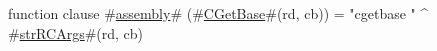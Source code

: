 function clause #\hyperref[sailMIPSzassembly]{assembly}# (#\hyperref[sailMIPSzCGetBase]{CGetBase}#(rd, cb)) = "cgetbase " ^ #\hyperref[sailMIPSzstrRCArgs]{strRCArgs}#(rd, cb)
